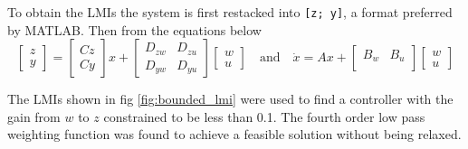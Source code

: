 \documentclass{article}
\begin{document}
To obtain the LMIs the system is first restacked into \texttt{[z; y]}, a format preferred by MATLAB.
Then from the equations below
\begin{equation}
    \begin{bmatrix}
        z \\
        y
    \end{bmatrix} = \begin{bmatrix}
        Cz \\
        Cy
    \end{bmatrix} x + \begin{bmatrix}
        D_{zw} & D_{zu} \\
        D_{yw} & D_{yu}
    \end{bmatrix} \begin{bmatrix}
        w \\
        u
    \end{bmatrix} \quad \text{and} \quad \dot{x} = Ax + \begin{bmatrix}
        B_w & B_u \\
    \end{bmatrix} \begin{bmatrix}
        w \\
        u
    \end{bmatrix}
\end{equation}

The LMIs shown in fig \ref{fig:bounded_lmi} were used to find a controller with the gain from $w$ to $z$ constrained to be less than 0.1.
The fourth order low pass weighting function was found to achieve a feasible solution without being relaxed.
\end{document}
